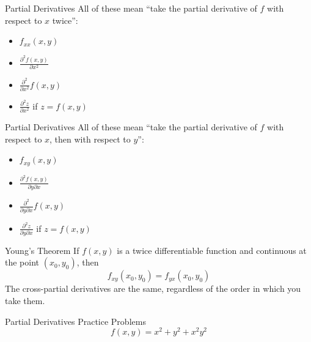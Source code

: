 \documentclass[aspectratio=169]{beamer}
\begin{document}
\begin{frame}{Partial Derivatives}\label{main1}
    All of these mean “take the partial derivative of $f$ with respect to $x$ twice”:
    \begin{itemize}
        \item $f_{xx}(x, y)$
        \item $\frac{\partial^2 f(x, y)}{\partial x^2}$
        \item $\frac{\partial^2}{\partial x^2} f(x, y)$
        \item $\frac{\partial^2 z}{\partial x^2}$ if $z = f(x, y)$
    \end{itemize}
\end{frame}

\begin{frame}{Partial Derivatives}\label{main1}
    All of these mean “take the partial derivative of $f$ with respect to $x$, then with respect to $y$”:
    \begin{itemize}
        \item $f_{xy}(x, y)$
        \item $\frac{\partial^2 f(x, y)}{\partial y \partial x}$
        \item $\frac{\partial^2}{\partial y \partial x} f(x, y)$
        \item $\frac{\partial^2 z}{\partial y \partial x}$ if $z = f(x, y)$
    \end{itemize}
\end{frame}

\begin{frame}{Young's Theorem}\label{main1}
    If $f(x, y)$ is a twice differentiable function and continuous at the point $(x_0, y_0)$, then
    \[
    f_{xy}(x_0, y_0) = f_{yx}(x_0, y_0)
    \]
    The cross-partial derivatives are the same, regardless of the order in which you take them.
\end{frame}

\begin{frame}{Partial Derivatives Practice Problems}\label{main1}
	\vspace{-4cm}
     \[
    f(x,y) = x^{2} + y^{2} + x^{2}y^{2}
    \]
\end{frame}
\end{document}

